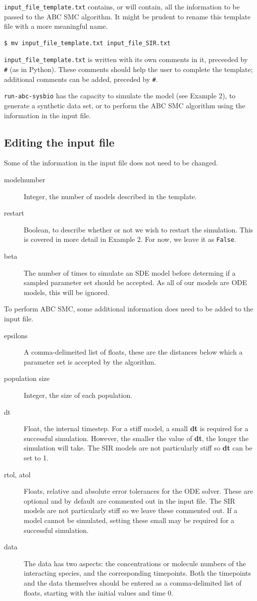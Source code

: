 \documentclass[a4paper]{report}
\begin{document}
\verb$input_file_template.txt$ contains, or will contain, all the information to be passed to the ABC SMC algorithm. It might be prudent to rename this template file with a more meaningful name.
\begin{verbatim}
$ mv input_file_template.txt input_file_SIR.txt
\end{verbatim}
\verb$input_file_template.txt$ is written with its own comments in it, preceeded by \verb$#$ (as in Python). These comments should help the user to complete the template; additional comments can be added, preceded by \verb$#$.

\verb$run-abc-sysbio$ has the capacity to simulate the model (see Example 2), to generate a synthetic data set, or to perform the ABC SMC algorithm using the information in the input file.

\subsection*{Editing the input file}
Some of the information in the input file does not need to be changed.
\begin{description}
\item[modelnumber] Integer, the number of models described in the template.
\item[restart] Boolean, to describe whether or not we wish to restart the simulation. This is covered in more detail in Example 2. For now, we leave it as \verb$False$.
\item[beta] The number of times to simulate an SDE model before determing if a sampled parameter set should be accepted. As all of our models are ODE models, this will be ignored.
\end{description}
To perform ABC SMC, some additional information does need to be added to the input file.
\begin{description}
\item[epsilons] A comma-delimeited list of floats, these are the distances below which a parameter set is accepted by the algorithm.
\item[population size] Integer, the size of each population. 
\item[dt] Float, the internal timestep. For a stiff model, a small \textbf{dt} is required for a successful simulation. However, the smaller the value of \textbf{dt}, the longer the simulation will take. The SIR models are not particularly stiff so \textbf{dt} can be set to 1.
\item[rtol, atol] Floats, relative and absolute error tolerances for the ODE solver. These are optional and by default are commented out in the input file. The SIR models are not particularly stiff so we leave these commented out. If a model cannot be simulated, setting these small may be required for a successful simulation. 
\item[data] The data has two aspects: the concentrations or molecule numbers of the interacting species, and the corresponding timepoints. Both the timepoints and the data themselves should be entered as a comma-delimited list of floats, starting with the initial values and time 0.
\end{description}
\end{document}
